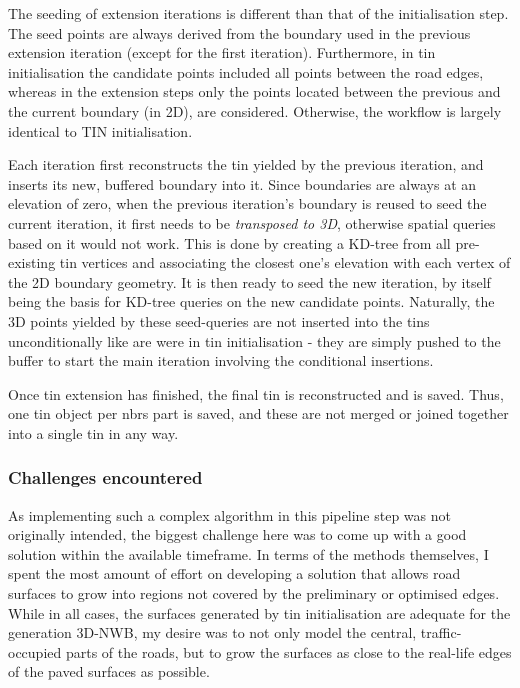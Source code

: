 The seeding of extension iterations is different than that of the initialisation step. The seed points are always derived from the boundary used in the previous extension iteration (except for the first iteration). Furthermore, in \ac{tin} initialisation the candidate points included all points between the road edges, whereas in the extension steps only the points located between the previous and the current boundary (in 2D), are considered. Otherwise, the workflow is largely identical to TIN initialisation.

Each iteration first reconstructs the \ac{tin} yielded by the previous iteration, and inserts its new, buffered boundary into it. Since boundaries are always at an elevation of zero, when the previous iteration's boundary is reused to seed the current iteration, it first needs to be \textit{transposed to 3D}, otherwise spatial queries based on it would not work. This is done by creating a KD-tree from all pre-existing \ac{tin} vertices and associating the closest one's elevation with each vertex of the 2D boundary geometry. It is then ready to seed the new iteration, by itself being the basis for KD-tree queries on the new candidate points. Naturally, the 3D points yielded by these seed-queries are not inserted into the \ac{tin}s unconditionally like are were in \ac{tin} initialisation - they are simply pushed to the buffer to start the main iteration involving the conditional insertions.

Once \ac{tin} extension has finished, the final \ac{tin} is reconstructed and is saved. Thus, one \ac{tin} object per \ac{nbrs} part is saved, and these are not merged or joined together into a single \ac{tin} in any way.

\subsubsection{Challenges encountered}

As implementing such a complex algorithm in this pipeline step was not originally intended, the biggest challenge here was to come up with a good solution within the available timeframe. In terms of the methods themselves, I spent the most amount of effort on developing a solution that allows road surfaces to grow into regions not covered by the preliminary or optimised edges. While in all cases, the surfaces generated by \ac{tin} initialisation are adequate for the generation 3D-NWB, my desire was to not only model the central, traffic-occupied parts of the roads, but to grow the surfaces as close to the real-life edges of the paved surfaces as possible.


